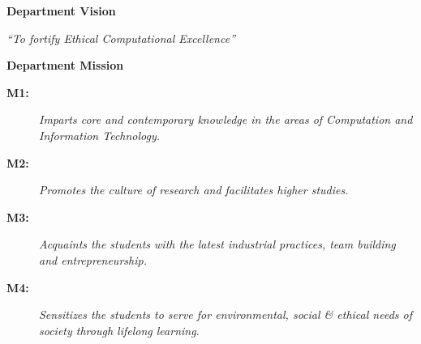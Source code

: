\clearpage
\thispagestyle{empty}
\ChristHeader

\vspace{0.3cm}

\begin{center}
  {\color{christBlue}\bfseries\LARGE Department Vision\par}
\end{center}
\begin{tcolorbox}[christbluebox]
\centering\itshape ``To fortify Ethical Computational Excellence''
\end{tcolorbox}

\vspace{0.3cm}

\begin{center}
  {\color{christBlue}\bfseries\LARGE Department Mission\par}
\end{center}
\begin{tcolorbox}[christgoldbox]
\begin{description}
  \item[\textbf{M1:}] \textit{Imparts core and contemporary knowledge in the areas of Computation and Information Technology.}
  \item[\textbf{M2:}] \textit{Promotes the culture of research and facilitates higher studies.}
  \item[\textbf{M3:}] \textit{Acquaints the students with the latest  industrial practices, team building and entrepreneurship.}
 \item[\textbf{M4:}] \textit{Sensitizes the students to serve for environmental, social & ethical needs of society through lifelong learning.}
\end{description}
\end{tcolorbox}

\vspace{0.3cm}

